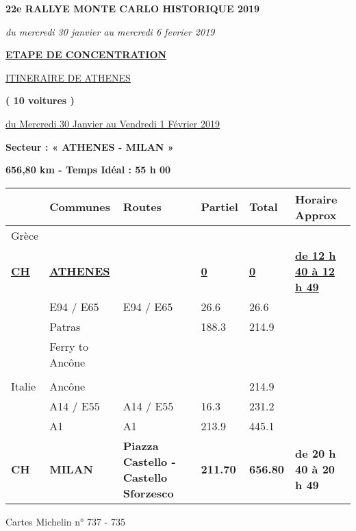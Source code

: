 \documentclass{article}%
\begin{document}
%
\normalsize%
\begin{center} \textbf{\LARGE{22e RALLYE MONTE CARLO HISTORIQUE 2019}} \end{center}%
\begin{center} \textit{du mercredi 30 janvier au mercredi 6 fevrier 2019} \end{center}%
\begin{center} \textbf{\underline{ETAPE DE CONCENTRATION}} \end{center}%
\begin{center} \underline{ITINERAIRE DE ATHENES					
} \end{center}%
\begin{center} \textbf{( 10 voitures )} \end{center}%
\begin{flushright} \underline{du  Mercredi 30 Janvier au Vendredi  1 Février 2019} \end{flushright}%
\begin{flushleft} \textbf{Secteur : « ATHENES - MILAN  »
} \end{flushleft}%
\begin{flushright} \textbf{656,80 km - Temps Idéal :   55 h 00 
} \end{flushright}%
\begin{longtable}{p{2.25cm}|p{7.0cm}|p{1.5cm}|p{1.5cm}|p{1.5cm}|p{3.5cm}}%
\hline%
&Communes&Routes&Partiel&Total&Horaire Approx\\%
\hline%
\endhead%
\endfoot%
\endlastfoot%
﻿Grèce& & & & & \\%
\textbf{\underline{CH}}&\textbf{\underline{ATHENES}}& &\textbf{\underline{0}}&\textbf{\underline{0}}&\textbf{\underline{de 12 h 40 à 12 h 49}}\\%
 &E94 / E65&E94 / E65&26.6&26.6& \\%
 &Patras& &188.3&214.9& \\%
 &Ferry to Ancône& & & & \\%
\hline& & & & & \\%
Italie&Ancône& & &214.9& \\%
 &A14 / E55&A14 / E55&16.3&231.2& \\%
 &A1&A1&213.9&445.1& \\%
\textbf{CH}&\textbf{MILAN}&\textbf{Piazza Castello - Castello Sforzesco}&\textbf{211.70}&\textbf{656.80}&\textbf{de 20 h 40 à 20 h 49
}\\%
\hline%
\end{longtable}%
\begin{flushleft} Cartes Michelin n° 737 - 735 \end{flushleft}%
\end{document}
